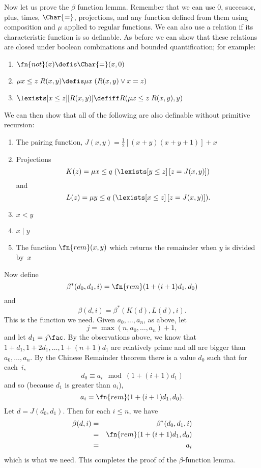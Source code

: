 \documentclass[../../../include/open-logic-section]{subfiles}
\begin{document}
Now let us prove the $\beta$ function lemma. Remember that we can use
$0$, successor, plus, times, $\Char{=}$, projections, and any function
defined from them using composition and $\mu$ applied to regular
functions. We can also use a relation if its characteristic function
is so definable. As before we can show that these relations are
closed under boolean combinations and bounded quantification; for
example:
\begin{enumerate}
\item $\fn{not}(x) \defis \Char{=}(x,0)$
\item $\mu{x \leq z} \; R(x,y) \defis \mu x \; (R(x,y) \lor x = z)$
\item $\lexists[x \leq z][R(x,y)] \defiff R(\mu {x \leq z} \; R(x,y), y)$
\end{enumerate}
We can then show that all of the following are also definable without
primitive recursion:
\begin{enumerate}
\item The pairing function, $J(x,y) = \frac{1}{2}[(x+y)(x+y+1)] + x$
\item Projections
\[
K(z) = \mu {x \leq q} \; (\lexists[y \leq z] \, [z = J(x,y)])
\]
and
\[
L(z) = \mu {y \leq q} \; (\lexists[x \leq z]\, [z = J(x,y)]).
\]
\item $x < y$
\item $x \mid y$
\item The function $\fn{rem}(x,y)$ which returns the remainder when
  $y$ is divided by~$x$
\end{enumerate}
Now define
\[
\beta^*(d_0,d_1,i) = \fn{rem}(1+(i+1) d_1,d_0)
\]
and
\[
\beta(d,i) = \beta^*(K(d),L(d),i).
\]
This is the function we need. Given $a_0,\dots,a_n$, as above, let
\[
j = \max(n,a_0,\dots,a_n)+1,
\]
and let $d_1 = j\fac$. By the observations above, we know that $1+d_1,
1+2 d_1, \dots, 1+(n+1) d_1$ are relatively prime and all are bigger
than $a_0,\dots,a_n$. By the Chinese Remainder theorem there is a
value $d_0$ such that for each~$i$,
\[
d_0 \equiv a_i \mod (1+(i+1)d_1)
\]
and so (because $d_1$ is greater than $a_i$),
\[
a_i = \fn{rem}(1+(i+1)d_1,d_0).
\]
Let $d = J(d_0,d_1)$. Then for each $i \le n$, we have
\begin{eqnarray*}
\beta(d,i) & = & \beta^*(d_0,d_1,i) \\
& = & \fn{rem}(1+(i+1) d_1,d_0) \\
& = & a_i
\end{eqnarray*}
which is what we need. This completes the proof of the
$\beta$-function lemma.
\end{document}
